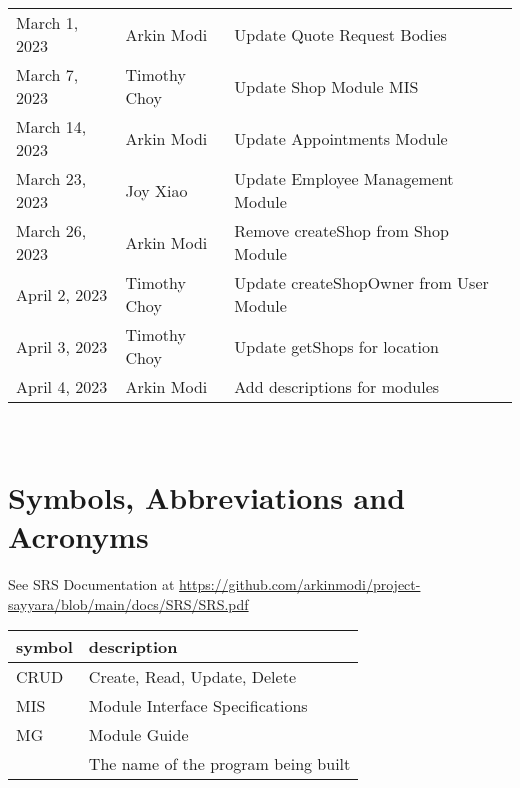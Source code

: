 \documentclass[12pt, titlepage]{article}
\begin{document}
\begin{table}[hp]
\begin{tabularx}{\textwidth}{llX}
		March 1, 2023     & Arkin Modi            & Update Quote Request Bodies              \\
		March 7, 2023     & Timothy Choy          & Update Shop Module MIS                   \\
		March 14, 2023    & Arkin Modi            & Update Appointments Module               \\
		March 23, 2023    & Joy Xiao              & Update Employee Management Module        \\
		March 26, 2023    & Arkin Modi            & Remove createShop from Shop Module       \\
		April 2, 2023     & Timothy Choy          & Update createShopOwner from User Module  \\
		April 3, 2023     & Timothy Choy          & Update getShops for location             \\
		April 4, 2023     & Arkin Modi            & Add descriptions for modules             \\
		\bottomrule
	\end{tabularx}
\end{table}

~\newpage

\section{Symbols, Abbreviations and Acronyms}

See SRS Documentation at
\url{https://github.com/arkinmodi/project-sayyara/blob/main/docs/SRS/SRS.pdf}


\begin{tabular}{l l}
	\toprule
	\textbf{symbol} & \textbf{description}                \\
	\midrule
	CRUD            & Create, Read, Update, Delete        \\
	MIS             & Module Interface Specifications     \\
	MG              & Module Guide                        \\
	\progname       & The name of the program being built \\
	\bottomrule
\end{tabular}

\newpage

\tableofcontents

\newpage

\listoftables
\end{document}
